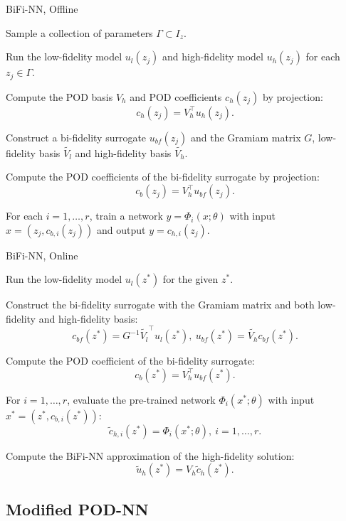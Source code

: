 \documentclass[10pt]{beamer}
\begin{document}
\begin{frame}{BiFi-NN, Offline}
\centering
\begin{algorithm}[H]
\caption{Offline stage for BiFi-NN}
{\small

Sample a collection of parameters $\Gamma\subset I_z $.

Run the low-fidelity model $u_l(z_j) $ and high-fidelity model $u_h(z_j)$ for each $z_j\in \Gamma $.

Compute the POD basis $V_h $ and POD coefficients $c_h(z_j) $ by projection:
$$
c_h(z_j) = V_h^\top u_h(z_j).
$$

Construct a bi-fidelity surrogate $u_{bf}(z_j) $ and the Gramiam matrix $G$, low-fidelity basis $\tilde{V_l}$ and high-fidelity basis $\tilde{V_h} $.

Compute the POD coefficients of the bi-fidelity surrogate by projection:
$$
c_b(z_j) = V_h^\top u_{bf}(z_j).
$$

For each $i = 1, \hdots, r$, train a network $y = \Phi_i(x; \theta) $ with input $x = (z_j, c_{b,i}(z_j))$ and output $y = c_{h,i}(z_j) $.

}
\end{algorithm}
\end{frame}

\begin{frame}{BiFi-NN, Online}
\begin{algorithm}[H]
\caption{Online stage for BiFi-NN}
{\small

Run the low-fidelity model $u_l(z^*) $ for the given $z^* $.

Construct the bi-fidelity surrogate with the Gramiam matrix and both low-fidelity and high-fidelity basis:
$$
c_{bf}(z^*) = G^{-1} \tilde{V_l}^\top u_l(z^*), \ u_{bf}(z^*) = \tilde{V_h}c_{bf}(z^*).
$$

Compute the POD coefficient of the bi-fidelity surrogate:
$$
c_b(z^*) = V_h^\top u_{bf}(z^*).
$$

For $i = 1, \hdots, r$, evaluate the pre-trained network $\Phi_i(x^*; \theta) $ with input $x^* = (z^*, c_{b,i}(z^*))$:
$$
\tilde{c}_{h,i}(z^*) = \Phi_i(x^*; \theta), \ i = 1, \hdots, r.
$$

Compute the BiFi-NN approximation of the high-fidelity solution:
$$
\tilde{u}_h(z^*) = V_h\tilde{c}_{h}(z^*).
$$
}
\end{algorithm}
\end{frame}

\subsection{Modified POD-NN}
\end{document}
